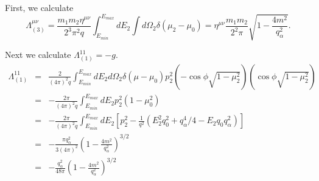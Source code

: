 \documentclass[12pt,letter]{article}
\begin{document}
First, we calculate 
\begin{equation*}
\Lambda_{(3)}^{\mu \nu} = \frac{m_1 m_2 \eta^{\mu \nu}}{2^3 \pi^2 q} 
\int_{E_{min}}^{E_{max}} dE_2  \int d\Omega_2 
\delta(\mu_2 - \mu_0) = \eta^{\mu \nu} \frac{m_1 m_2}{2^2 \pi} 
\sqrt{1 - \frac{4m^2}{q_\alpha^2}}.
\end{equation*}

Next we calculate $\Lambda_{(1)}^{11} = -g$.  
\begin{eqnarray*}
\Lambda_{(1)}^{11} &=& \frac{2}{(4 \pi)^2 q}\int_{E_{min}}^{E_{max}} dE_2 
d\Omega_2 \delta(\mu-\mu_0) p^2_2 
(-\cos \phi \sqrt{1-\mu_2^2})(\cos \phi \sqrt{1-\mu_2^2}) \\
&=& -\frac{2 \pi}{(4 \pi)^2 q}\int_{E_{min}}^{E_{max}} dE_2 
p^2_2(1-\mu_0^2) \\
&=& -\frac{2 \pi}{(4 \pi)^2 q}\int_{E_{min}}^{E_{max}} dE_2 
\left[p^2_2 - \frac{1}{q^2} 
\left(E_2^2 q_0^2 + q_\alpha^4/4 - E_2 q_0 q_\alpha^2\right) \right] \\
&=& -\frac{\pi q_\alpha^2}{3(4 \pi)^2}
\left(1 - \frac{4m^2}{q_\alpha^2}\right)^{3/2} \\
&=& -\frac{q_\alpha^2}{48 \pi}
\left(1 - \frac{4m^2}{q_\alpha^2}\right)^{3/2}
\end{eqnarray*}
\end{document}
